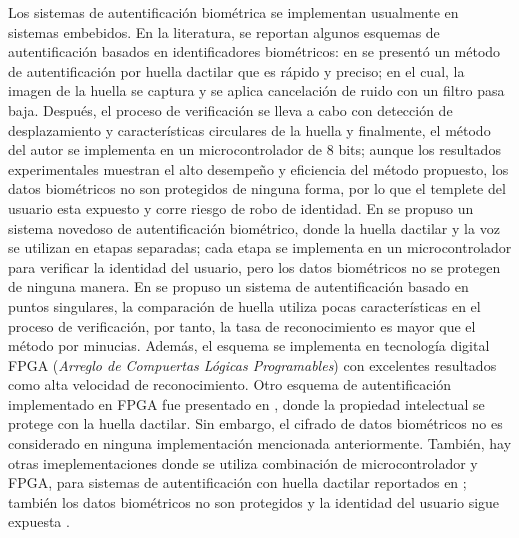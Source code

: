 Los sistemas de autentificación biométrica se implementan usualmente en sistemas embebidos. En la literatura, se reportan algunos esquemas de autentificación basados en identificadores biométricos: en \cite{CyD_2005} se presentó un método de autentificación por huella dactilar que es rápido y preciso; en el cual, la imagen de la huella se captura y se aplica cancelación de ruido con un filtro pasa baja. Después, el proceso de verificación se lleva a cabo con detección de desplazamiento y características circulares de la huella y finalmente, el método del autor se implementa en un microcontrolador de 8 bits; aunque los resultados experimentales muestran el alto desempeño y eficiencia del método propuesto, los datos biométricos no son protegidos de ninguna forma, por lo que el templete del usuario esta expuesto y corre riesgo de robo de identidad. En \cite{N_2008} se propuso un sistema novedoso de autentificación biométrico, donde la huella dactilar y la voz se utilizan en etapas separadas; cada etapa se implementa en un microcontrolador para verificar la identidad del usuario, pero los datos biométricos no se protegen de ninguna manera. En \cite{MEtAl_2008} se propuso un sistema de autentificación basado en puntos singulares, la comparación de huella utiliza pocas características en el proceso de verificación, por tanto, la tasa de reconocimiento es mayor que el método por minucias. Además, el esquema se implementa en tecnología digital FPGA (\textit{Arreglo de Compuertas Lógicas Programables}) con excelentes resultados como alta velocidad de reconocimiento. Otro esquema de autentificación implementado en FPGA fue presentado en \cite{NEtAl_2013}, donde la propiedad intelectual se protege con la huella dactilar. Sin embargo, el cifrado de datos biométricos no es considerado en ninguna implementación mencionada anteriormente. También, hay otras imeplementaciones donde se utiliza combinación de microcontrolador y FPGA, para sistemas de autentificación con huella dactilar reportados en \cite{FEtAl_2007, WEtAl_2004}; también los datos biométricos no son protegidos y la identidad del usuario sigue expuesta \cite{R_2007}.  \\         

